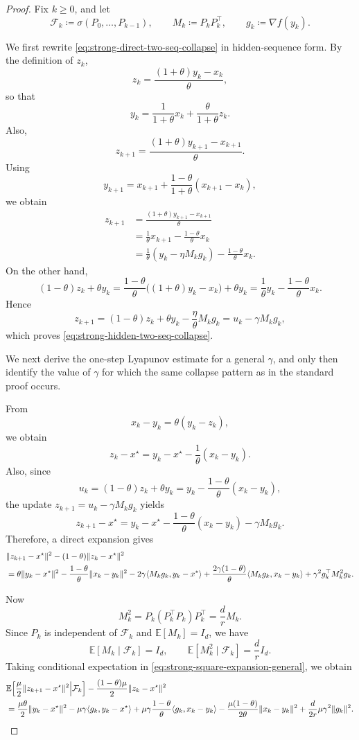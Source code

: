 \documentclass[10pt]{article}
\begin{document}
\begin{proof}
Fix \(k\ge0\), and let
\[
\mathcal F_k\coloneqq \sigma(P_0,\dots,P_{k-1}),
\qquad
M_k\coloneqq P_kP_k^\top,
\qquad
g_k\coloneqq \nabla f(y_k).
\]

We first rewrite \eqref{eq:strong-direct-two-seq-collapse} in hidden-sequence form.
By the definition of \(z_k\),
\[
z_k=\frac{(1+\theta)y_k-x_k}{\theta},
\]
so that
\[
y_k=\frac{1}{1+\theta}x_k+\frac{\theta}{1+\theta}z_k.
\]
Also,
\[
z_{k+1}
=\frac{(1+\theta)y_{k+1}-x_{k+1}}{\theta}.
\]
Using
\[
y_{k+1}=x_{k+1}+\frac{1-\theta}{1+\theta}(x_{k+1}-x_k),
\]
we obtain
\begin{align*}
z_{k+1}
&=
\frac{(1+\theta)y_{k+1}-x_{k+1}}{\theta}\\
&=
\frac{1}{\theta}x_{k+1}-\frac{1-\theta}{\theta}x_k\\
&=
\frac{1}{\theta}(y_k-\eta M_k g_k)-\frac{1-\theta}{\theta}x_k.
\end{align*}
On the other hand,
\[
(1-\theta)z_k+\theta y_k
=
\frac{1-\theta}{\theta}\bigl((1+\theta)y_k-x_k\bigr)+\theta y_k
=
\frac{1}{\theta}y_k-\frac{1-\theta}{\theta}x_k.
\]
Hence
\[
z_{k+1}=(1-\theta)z_k+\theta y_k-\frac{\eta}{\theta}M_k g_k
=u_k-\gamma M_k g_k,
\]
which proves \eqref{eq:strong-hidden-two-seq-collapse}.

We next derive the one-step Lyapunov estimate for a general \(\gamma\), and only then identify
the value of \(\gamma\) for which the same collapse pattern as in the standard proof occurs.

From
\[
x_k-y_k=\theta(y_k-z_k),
\]
we obtain
\[
z_k-x^\star
=
y_k-x^\star-\frac{1}{\theta}(x_k-y_k).
\]
Also, since
\[
u_k=(1-\theta)z_k+\theta y_k
=
y_k-\frac{1-\theta}{\theta}(x_k-y_k),
\]
the update \(z_{k+1}=u_k-\gamma M_k g_k\) yields
\[
z_{k+1}-x^\star
=
y_k-x^\star-\frac{1-\theta}{\theta}(x_k-y_k)-\gamma M_k g_k.
\]
Therefore, a direct expansion gives
\begin{align}
&\|z_{k+1}-x^\star\|^2-(1-\theta)\|z_k-x^\star\|^2
\notag\\
&=
\theta\|y_k-x^\star\|^2
-\frac{1-\theta}{\theta}\|x_k-y_k\|^2
-2\gamma\langle M_k g_k,y_k-x^\star\rangle
+\frac{2\gamma(1-\theta)}{\theta}\langle M_k g_k,x_k-y_k\rangle
+\gamma^2 g_k^\top M_k^2 g_k.
\label{eq:strong-square-expansion-general}
\end{align}

Now
\[
M_k^2=P_k(P_k^\top P_k)P_k^\top=\frac{d}{r}M_k.
\]
Since \(P_k\) is independent of \(\mathcal F_k\) and \(\mathbb E[M_k]=I_d\), we have
\[
\mathbb E[M_k\mid\mathcal F_k]=I_d,
\qquad
\mathbb E[M_k^2\mid\mathcal F_k]=\frac{d}{r}I_d.
\]
Taking conditional expectation in \eqref{eq:strong-square-expansion-general}, we obtain
\begin{align}
&\mathbb E\!\left[
\frac{\mu}{2}\|z_{k+1}-x^\star\|^2
\middle|\mathcal F_k
\right]
-\frac{(1-\theta)\mu}{2}\|z_k-x^\star\|^2
\notag\\
&=
\frac{\mu\theta}{2}\|y_k-x^\star\|^2
-\mu\gamma\langle g_k,y_k-x^\star\rangle
+\mu\gamma\frac{1-\theta}{\theta}\langle g_k,x_k-y_k\rangle
-\frac{\mu(1-\theta)}{2\theta}\|x_k-y_k\|^2
+\frac{d}{2r}\mu\gamma^2\|g_k\|^2.
\label{eq:strong-z-diff-general}
\end{align}


\end{proof}
\end{document}
